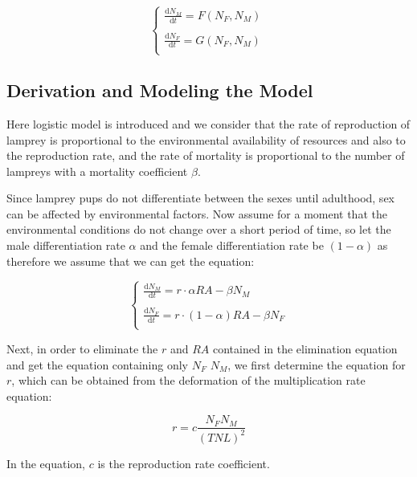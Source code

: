 \documentclass[12pt]{article}  %
\begin{document}
\begin{equation}\label{eq:4-6}
\begin{cases}
	\frac{\mathrm{d}N_{M}}{\mathrm{d}t}=F(N_{F},N_{M})\
	\\  \\
	\frac{\mathrm{d}N_{F}}{\mathrm{d}t}=G(N_{F},N_{M})\\
\end{cases}
\end{equation}

\subsection{Derivation and Modeling the Model}
Here logistic model is introduced and we consider that the rate of reproduction of lamprey is proportional to the environmental availability of resources and also to the reproduction rate, and the rate of mortality is proportional to the number of lampreys with a mortality coefficient $\beta$.

Since lamprey pups do not differentiate between the sexes until adulthood, sex can be affected by environmental factors. Now assume for a moment that the environmental conditions do not change over a short period of time, so let the male differentiation rate $\alpha$ and the female differentiation rate be $(1-\alpha)$ as therefore we assume that we can get the equation:

\begin{equation}\label{eq:4-7}
\begin{cases}
	\frac{\mathrm{d}N_{M}}{\mathrm{d}t}=r \cdot \alpha RA-\beta N_{M} \\
	\\
	\frac{\mathrm{d}N_{F}}{\mathrm{d}t}=r \cdot(1 - \alpha )RA-\beta N_{F} \\
\end{cases}
\end{equation}

Next, in order to eliminate the $r$ and $RA$ contained in the elimination equation and get the equation containing only $N_F$ $N_M$, we first determine the equation for $r$, which can be obtained from the deformation of the multiplication rate equation:

\begin{equation}\label{eq:4-8}
r = c\frac{N_{F}N_{M}}{(TNL)^{2}}
\end{equation}

In the equation, $c$ is the reproduction rate coefficient.
\end{document}
